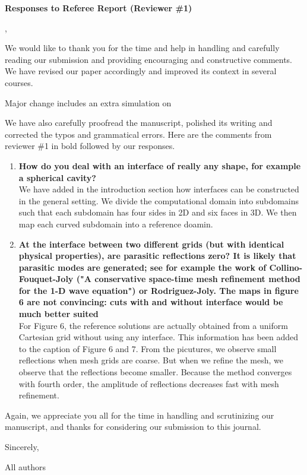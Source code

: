 \documentclass[twoside,11pt]{article}
\begin{document}
\begin{center}
{\Large \textbf{Responses to Referee Report (Reviewer \#1)}}
\end{center}

,

We would like to thank you for the time and help in handling and carefully reading our submission and providing encouraging and constructive comments.  We have revised our paper accordingly and improved its context in several courses. 

Major change includes an extra simulation on

We have also carefully proofread the manuscript, polished its writing and corrected the typos and grammatical errors.  Here are the comments from reviewer \#1 in bold followed by our responses.

\begin{enumerate}
\item \textbf{How do you deal with an interface of really any shape, for example a spherical cavity?}\\
 We have added in the introduction section how interfaces can be constructed in the general setting. We divide the computational domain into subdomains such that each subdomain has four sides in 2D and six faces in 3D. We then map each curved subdomain into a reference doamin.

\item  \textbf{At the interface between two different grids (but with identical physical properties), are parasitic reflections zero? It is likely that parasitic modes are generated; see for example the work of Collino-Fouquet-Joly ("A conservative space-time mesh refinement method for the 1-D wave equation") or Rodriguez-Joly. The maps in figure 6 are not convincing: cuts with and without interface would be much better suited}\\
 For Figure 6, the reference solutions are actually obtained from a uniform Cartesian grid without using any interface. This information has been added to the caption of Figure 6 and 7. From the picutures, we observe small reflections when mesh grids are coarse. But when we refine the mesh, we observe that the reflections become smaller. Because the method converges with fourth order, the amplitude of reflections decreases fast with mesh refinement. %

\end{enumerate}

Again, we appreciate you all for the time in handling and scrutinizing our manuscript, and thanks for considering our submission to this journal.

Sincerely, 

All authors
\end{document}
